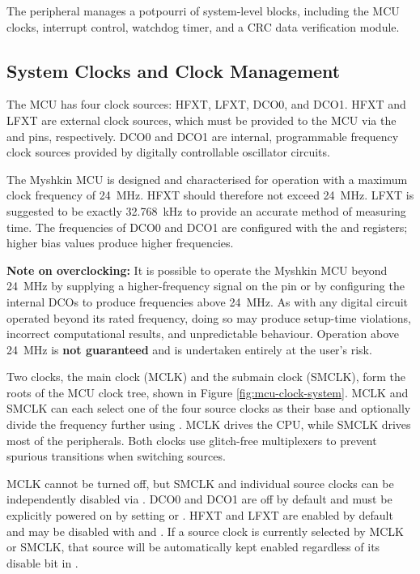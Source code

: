 The  peripheral manages a potpourri of system-level blocks, including the MCU clocks, interrupt control, watchdog timer, and a CRC data verification module.

\subsection{System Clocks and Clock Management} \label{ss:clocks}
The MCU has four clock sources: HFXT, LFXT, DCO0, and DCO1. HFXT and LFXT are external clock sources, which must be provided to the MCU via the  and  pins, respectively. DCO0 and DCO1 are internal, programmable frequency clock sources provided by digitally controllable oscillator circuits.

The Myshkin MCU is designed and characterised for operation with a maximum clock frequency of 24~\si{\mega\hertz}. HFXT should therefore not exceed 24~\si{\mega\hertz}. LFXT is suggested to be exactly 32.768~\si{\kilo\hertz} to provide an accurate method of measuring time. The frequencies of DCO0 and DCO1 are configured with the  and  registers; higher bias values produce higher frequencies.

\textbf{Note on overclocking:} It is possible to operate the Myshkin MCU beyond 24~\si{\mega\hertz} by supplying a higher-frequency signal on the  pin or by configuring the internal DCOs to produce frequencies above 24~\si{\mega\hertz}. As with any digital circuit operated beyond its rated frequency, doing so may produce setup-time violations, incorrect computational results, and unpredictable behaviour. Operation above 24~\si{\mega\hertz} is \textbf{not guaranteed} and is undertaken entirely at the user's risk.

Two clocks, the main clock (MCLK) and the submain clock (SMCLK), form the roots of the MCU clock tree, shown in Figure \ref{fig:mcu-clock-system}. MCLK and SMCLK can each select one of the four source clocks as their base and optionally divide the frequency further using . MCLK drives the CPU, while SMCLK drives most of the peripherals. Both clocks use glitch-free multiplexers to prevent spurious transitions when switching sources.

MCLK cannot be turned off, but SMCLK and individual source clocks can be independently disabled via . DCO0 and DCO1 are off by default and must be explicitly powered on by setting  or . HFXT and LFXT are enabled by default and may be disabled with  and . If a source clock is currently selected by MCLK or SMCLK, that source will be automatically kept enabled regardless of its disable bit in .

